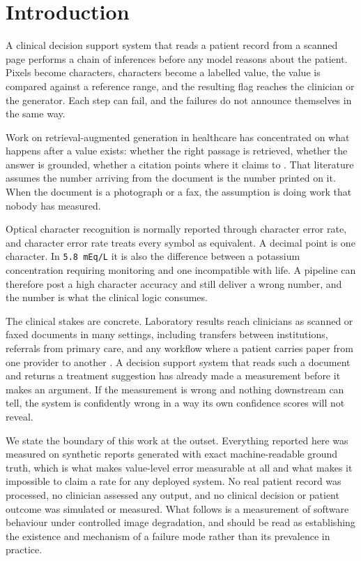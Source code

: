 \documentclass[11pt]{article}
\begin{document}
\section{Introduction}

A clinical decision support system that reads a patient record from a scanned page performs a
chain of inferences before any model reasons about the patient. Pixels become characters,
characters become a labelled value, the value is compared against a reference range, and the
resulting flag reaches the clinician or the generator. Each step can fail, and the failures do
not announce themselves in the same way.

Work on retrieval-augmented generation in healthcare has concentrated on what happens after a
value exists: whether the right passage is retrieved, whether the answer is grounded, whether a
citation points where it claims to \citep{gao2023rag,amugongo2025rag,lu2024clinicalrag}. That
literature assumes the number arriving from the document is the number printed on it. When the
document is a photograph or a fax, the assumption is doing work that nobody has measured.

Optical character recognition is normally reported through character error rate, and character
error rate treats every symbol as equivalent. A decimal point is one character. In
\texttt{5.8 mEq/L} it is also the difference between a potassium concentration requiring
monitoring and one incompatible with life. A pipeline can therefore post a high character
accuracy and still deliver a wrong number, and the number is what the clinical logic consumes.

The clinical stakes are concrete. Laboratory results reach clinicians as scanned or faxed
documents in many settings, including transfers between institutions, referrals from primary
care, and any workflow where a patient carries paper from one provider to another
\citep{wang2026keycoverage}. A decision support system that reads such a document and returns a
treatment suggestion has already made a measurement before it makes an argument. If the
measurement is wrong and nothing downstream can tell, the system is confidently wrong in a way
its own confidence scores will not reveal.

We state the boundary of this work at the outset. Everything reported here was measured on
synthetic reports generated with exact machine-readable ground truth, which is what makes
value-level error measurable at all and what makes it impossible to claim a rate for any
deployed system. No real patient record was processed, no clinician assessed any output, and no
clinical decision or patient outcome was simulated or measured. What follows is a measurement of
software behaviour under controlled image degradation, and should be read as establishing the
existence and mechanism of a failure mode rather than its prevalence in practice.
\end{document}
